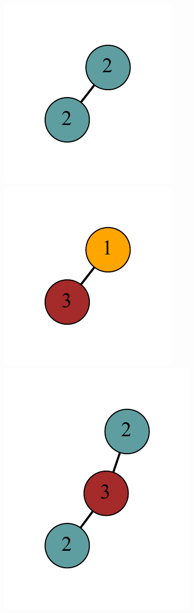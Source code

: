 \documentclass[12pt]{article}
\theoremstyle{plain}
\theoremstyle{definition}
\theoremstyle{remark}
\begin{document}
	\begin{figure}[htb]
		\includegraphics[scale=0.35]{Delta3TriangleFree/1[2,2].pdf}
		\includegraphics[scale=0.35]{Delta3TriangleFree/1[3,1].pdf}
		\includegraphics[scale=0.35]{Delta3TriangleFree/011[2,2,3].pdf}

\end{figure}
\end{document}
